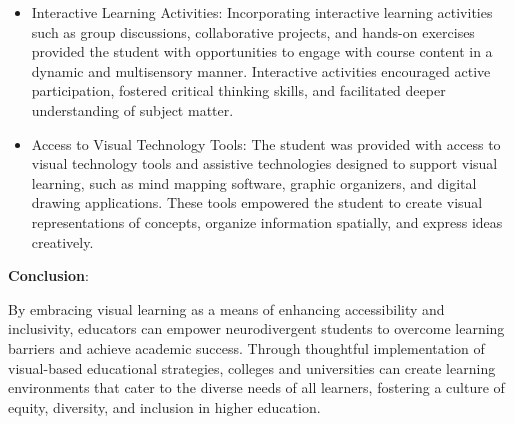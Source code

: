 \documentclass[a4paper,12pt]{article}
\begin{document}
\begin{large}
\begin{itemize}
\item Interactive Learning Activities: Incorporating interactive learning activities such as group discussions, collaborative projects, and hands-on exercises provided the student with opportunities to engage with course content in a dynamic and multisensory manner. Interactive activities encouraged active participation, fostered critical thinking skills, and facilitated deeper understanding of subject matter.

\item Access to Visual Technology Tools: The student was provided with access to visual technology tools and assistive technologies designed to support visual learning, such as mind mapping software, graphic organizers, and digital drawing applications. These tools empowered the student to create visual representations of concepts, organize information spatially, and express ideas creatively.
\end{itemize}


\textbf{Conclusion}:

By embracing visual learning as a means of enhancing accessibility and inclusivity, educators can empower neurodivergent students to overcome learning barriers and achieve academic success. Through thoughtful implementation of visual-based educational strategies, colleges and universities can create learning environments that cater to the diverse needs of all learners, fostering a culture of equity, diversity, and inclusion in higher education.

\end{large}
\end{document}

